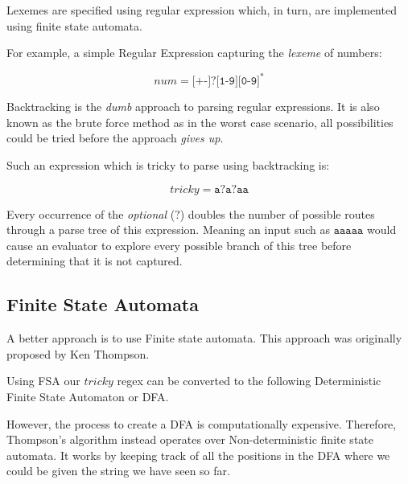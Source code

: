 \documentclass{article}
\renewcommand{\i}[1]{\textit{#1}}
\begin{document}
Lexemes are specified using regular expression which, in turn, are implemented using finite state automata.

For example, a simple Regular Expression capturing the \i{lexeme} of numbers:

\[
  num = \texttt{[+-]?[1-9][0-9]}^\ast
\]


Backtracking is the \i{dumb} approach to parsing regular expressions. It is also known as the brute force method as in the worst case scenario, all possibilities could be tried before the approach \i{gives up}.

Such an expression which is tricky to parse using backtracking is:

\[
  tricky = \texttt{a?a?aa}
\]


Every occurrence of the \i{optional} ($?$) doubles the number of possible routes through a parse tree of this expression. Meaning an input such as $ \texttt{aaaaa}$ would cause an evaluator to explore every possible branch of this tree before determining that it is not captured.

\subsection{Finite State Automata}

A better approach is to use Finite state automata. This approach was originally proposed by Ken Thompson. 

Using FSA our $tricky$ regex can be converted to the following Deterministic Finite State Automaton or DFA. 
\begin{center}
\end{center}

However, the process to create a DFA is computationally expensive. Therefore, Thompson's algorithm instead operates over Non-deterministic finite state automata. It works by keeping track of all the positions in the DFA where we could be given the string we have seen so far.
\end{document}
